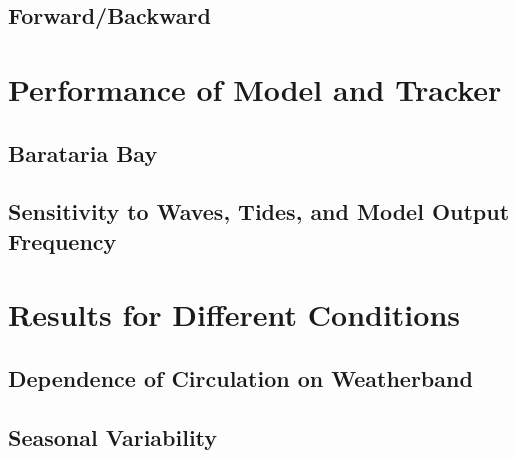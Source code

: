 \documentclass[11pt]{article}
\begin{document}





\subsection{Forward/Backward}


\section{Performance of Model and Tracker}

\subsection{Barataria Bay}

\subsection{Sensitivity to Waves, Tides, and Model Output Frequency}


\section{Results for Different Conditions}

\subsection{Dependence of Circulation on Weatherband}

\subsection{Seasonal Variability}
\end{document}
